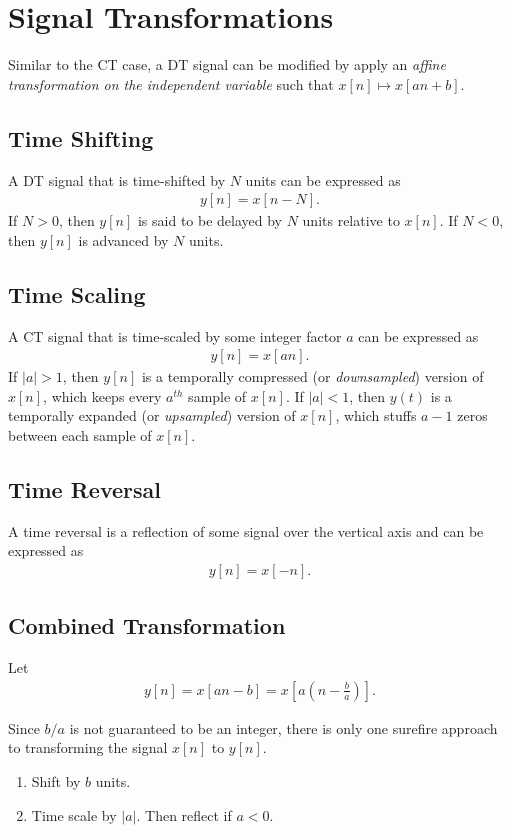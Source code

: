 \documentclass{report}
\begin{document}
\section{Signal Transformations}
Similar to the CT case, a DT signal can be modified by apply an \emph{affine transformation on the independent variable} such that $x[n] \mapsto x[an+b]$.

\subsection{Time Shifting}
A DT signal that is time-shifted by $N$ units can be expressed as 
\begin{align}
    y[n] = x[n-N].
\end{align}
If $N>0$, then $y[n]$ is said to be delayed by $N$ units relative to $x[n]$. If $N<0$, then $y[n]$ is advanced by $N$ units.

\subsection{Time Scaling}
A CT signal that is time-scaled by some integer factor $a$ can be expressed as 
\begin{align}
    y[n] = x[an].
\end{align}
If $|a|>1$, then $y[n]$ is a temporally compressed (or \emph{downsampled}) version of $x[n]$, which keeps every $a^{th}$ sample of $x[n]$. 
If $|a|<1$, then $y(t)$ is a temporally expanded (or \emph{upsampled}) version of $x[n]$, which stuffs $a-1$ zeros between each sample of $x[n]$.

\subsection{Time Reversal}
A time reversal is a reflection of some signal over the vertical axis and can be expressed as 
\begin{align}
    y[n]=x[-n].
\end{align}

\subsection{Combined Transformation}
Let 
\begin{align}
    y[n] = x[an-b] = x\left[a\left(n-\frac{b}{a}\right)\right].
\end{align}
\begin{tcolorbox}[width=\textwidth,colback={white}, sharp corners]
Since $b/a$ is not guaranteed to be an integer, there is only one surefire approach to transforming the signal $x[n]$ to $y[n]$.
\begin{enumerate}
    \itemsep0em
    \item Shift by $b$ units.
    \item Time scale by $|a|$. Then reflect if $a<0$.
\end{enumerate}
\end{tcolorbox}
\end{document}

